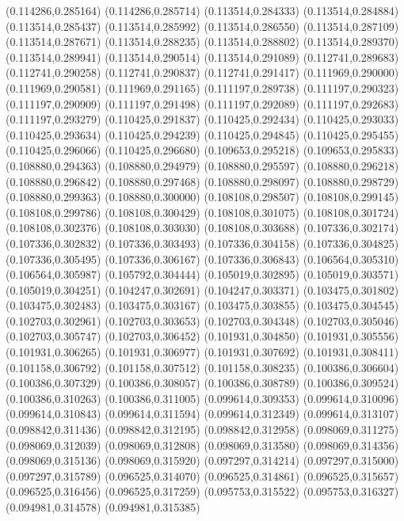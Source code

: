 (0.114286,0.285164)
(0.114286,0.285714)
(0.113514,0.284333)
(0.113514,0.284884)
(0.113514,0.285437)
(0.113514,0.285992)
(0.113514,0.286550)
(0.113514,0.287109)
(0.113514,0.287671)
(0.113514,0.288235)
(0.113514,0.288802)
(0.113514,0.289370)
(0.113514,0.289941)
(0.113514,0.290514)
(0.113514,0.291089)
(0.112741,0.289683)
(0.112741,0.290258)
(0.112741,0.290837)
(0.112741,0.291417)
(0.111969,0.290000)
(0.111969,0.290581)
(0.111969,0.291165)
(0.111197,0.289738)
(0.111197,0.290323)
(0.111197,0.290909)
(0.111197,0.291498)
(0.111197,0.292089)
(0.111197,0.292683)
(0.111197,0.293279)
(0.110425,0.291837)
(0.110425,0.292434)
(0.110425,0.293033)
(0.110425,0.293634)
(0.110425,0.294239)
(0.110425,0.294845)
(0.110425,0.295455)
(0.110425,0.296066)
(0.110425,0.296680)
(0.109653,0.295218)
(0.109653,0.295833)
(0.108880,0.294363)
(0.108880,0.294979)
(0.108880,0.295597)
(0.108880,0.296218)
(0.108880,0.296842)
(0.108880,0.297468)
(0.108880,0.298097)
(0.108880,0.298729)
(0.108880,0.299363)
(0.108880,0.300000)
(0.108108,0.298507)
(0.108108,0.299145)
(0.108108,0.299786)
(0.108108,0.300429)
(0.108108,0.301075)
(0.108108,0.301724)
(0.108108,0.302376)
(0.108108,0.303030)
(0.108108,0.303688)
(0.107336,0.302174)
(0.107336,0.302832)
(0.107336,0.303493)
(0.107336,0.304158)
(0.107336,0.304825)
(0.107336,0.305495)
(0.107336,0.306167)
(0.107336,0.306843)
(0.106564,0.305310)
(0.106564,0.305987)
(0.105792,0.304444)
(0.105019,0.302895)
(0.105019,0.303571)
(0.105019,0.304251)
(0.104247,0.302691)
(0.104247,0.303371)
(0.103475,0.301802)
(0.103475,0.302483)
(0.103475,0.303167)
(0.103475,0.303855)
(0.103475,0.304545)
(0.102703,0.302961)
(0.102703,0.303653)
(0.102703,0.304348)
(0.102703,0.305046)
(0.102703,0.305747)
(0.102703,0.306452)
(0.101931,0.304850)
(0.101931,0.305556)
(0.101931,0.306265)
(0.101931,0.306977)
(0.101931,0.307692)
(0.101931,0.308411)
(0.101158,0.306792)
(0.101158,0.307512)
(0.101158,0.308235)
(0.100386,0.306604)
(0.100386,0.307329)
(0.100386,0.308057)
(0.100386,0.308789)
(0.100386,0.309524)
(0.100386,0.310263)
(0.100386,0.311005)
(0.099614,0.309353)
(0.099614,0.310096)
(0.099614,0.310843)
(0.099614,0.311594)
(0.099614,0.312349)
(0.099614,0.313107)
(0.098842,0.311436)
(0.098842,0.312195)
(0.098842,0.312958)
(0.098069,0.311275)
(0.098069,0.312039)
(0.098069,0.312808)
(0.098069,0.313580)
(0.098069,0.314356)
(0.098069,0.315136)
(0.098069,0.315920)
(0.097297,0.314214)
(0.097297,0.315000)
(0.097297,0.315789)
(0.096525,0.314070)
(0.096525,0.314861)
(0.096525,0.315657)
(0.096525,0.316456)
(0.096525,0.317259)
(0.095753,0.315522)
(0.095753,0.316327)
(0.094981,0.314578)
(0.094981,0.315385)
